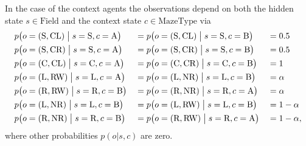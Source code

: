 In the case of the context agents the observations depend on both the hidden state \(s \in \text{Field}\) and the context state \(c \in \text{MazeType}\) via
\begin{alignat}{3}
    & p\bigl(o=(\text{S},\text{CL})\bigm|s=\text{S}, c=\text{A}\bigr) &  & = p\bigl(o=(\text{S},\text{CL})\bigm|s=\text{S}, c=\text{B}\bigr) &  & = 0.5      \nonumber \\
    & p\bigl(o=(\text{S},\text{CR})\bigm|s=\text{S}, c=\text{A}\bigr) &  & = p\bigl(o=(\text{S},\text{CR})\bigm|s=\text{S}, c=\text{B}\bigr) &  & = 0.5      \nonumber \\
    & p\bigl(o=(\text{C},\text{CL})\bigm|s=\text{C}, c=\text{A}\bigr) &  & = p\bigl(o=(\text{C},\text{CR})\bigm|s=\text{C}, c=\text{B}\bigr) &  & = 1        \nonumber \\
    & p\bigl(o=(\text{L},\text{RW})\bigm|s=\text{L}, c=\text{A}\bigr) &  & = p\bigl(o=(\text{L},\text{NR})\bigm|s=\text{L}, c=\text{B}\bigr) &  & = \alpha   \nonumber \\
    & p\bigl(o=(\text{R},\text{RW})\bigm|s=\text{R}, c=\text{B}\bigr) &  & = p\bigl(o=(\text{R},\text{NR})\bigm|s=\text{R}, c=\text{A}\bigr) &  & = \alpha   \nonumber \\
    & p\bigl(o=(\text{L},\text{NR})\bigm|s=\text{L}, c=\text{B}\bigr) &  & = p\bigl(o=(\text{L},\text{RW})\bigm|s=\text{L}, c=\text{B}\bigr) &  & = 1-\alpha \nonumber \\
    & p\bigl(o=(\text{R},\text{NR})\bigm|s=\text{R}, c=\text{B}\bigr) &  & = p\bigl(o=(\text{R},\text{RW})\bigm|s=\text{R}, c=\text{A}\bigr) &  & = 1-\alpha,
\end{alignat}
where other probabilities \(p(o|s,c)\) are zero.

